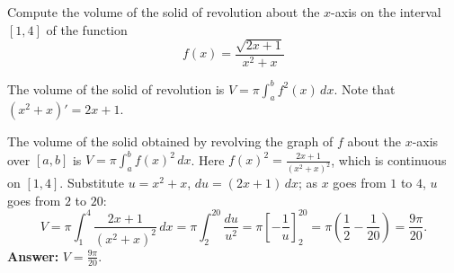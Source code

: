 
\begin{question}
Compute the volume of the solid of revolution about the $x$-axis on the interval $[1,4]$ of the function
\[ f(x) = \frac{\sqrt{2x+1}}{x^2 + x} \]
\end{question}

\begin{hint}
The volume of the solid of revolution is $V = \pi\int_a^b f^2(x)\,dx$. Note that $(x^2 + x)' = 2x + 1$.
\end{hint}

\begin{solution}
The volume of the solid obtained by revolving the graph of $f$ about the $x$-axis over $[a,b]$ is $V = \pi\int_a^b f(x)^2\,dx$. Here
$f(x)^2 = \frac{2x+1}{(x^2 + x)^2}$, which is continuous on $[1,4]$. Substitute $u = x^2 + x$, $du = (2x + 1)\,dx$; as $x$ goes from $1$ to $4$, $u$ goes from $2$ to $20$:
\[ V = \pi\int_1^4\frac{2x+1}{(x^2+x)^2}\,dx = \pi\int_2^{20}\frac{du}{u^2} = \pi\left[-\frac1u\right]_2^{20} = \pi\left(\frac12 - \frac1{20}\right) = \frac{9\pi}{20}. \]
\textbf{Answer:} $V = \frac{9\pi}{20}$.
\end{solution}
